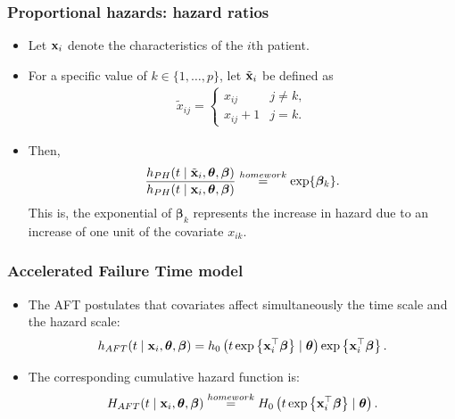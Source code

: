 \documentclass[10pt,handout,compress]{beamer}
\newcommand{\bbeta}{\bm{\beta}}
\newcommand{\btheta}{\bm{\theta}}
\newcommand{\bx}{{\bf x}}
\begin{document}
\begin{frame}
\frametitle{Proportional hazards: hazard ratios}
\begin{itemize}
\item Let $\bx_i$ denote the characteristics of the $i$th patient. \pause
\item For a specific value of $k\in\{1,\dots,p\}$, let $\tilde{\bx}_i$ be defined as 
\begin{eqnarray*}
\tilde{x}_{ij} =
\begin{cases}
x_{ij} & j\neq k,\\
x_{ij}+1 & j = k.
\end{cases}
\end{eqnarray*}
\pause
\item Then,
\[ \dfrac{h_{PH}(t \mid \tilde{\bx}_i, \btheta,\bbeta)}{h_{PH}(t \mid \bx_i, \btheta,\bbeta)}  \stackrel{\tiny homework}{=} \exp\{\bbeta_k\} .\]
\pause This is, the exponential of $\bbeta_k$ represents the increase in hazard due to an increase of one unit of the covariate  $x_{ik}$.
\end{itemize}
\end{frame}

\begin{frame}
\frametitle{Accelerated Failure Time model}
\begin{itemize}
\item The AFT postulates that covariates affect simultaneously the time scale and the hazard scale:
\begin{equation*}
h_{AFT}(t \mid \bx_i, \btheta,\bbeta) = h_0\left(t  \exp\left\{ \bx_i ^{\top}\bbeta\right\}\mid \btheta\right) \exp\left\{ \bx_i ^{\top}\bbeta\right\} .
\end{equation*}
\pause
\item The corresponding cumulative hazard function is:
\begin{equation*}
H_{AFT}(t \mid \bx_i, \btheta,\bbeta) \stackrel{\tiny homework}{=}  H_0\left(t  \exp\left\{ \bx_i ^{\top}\bbeta\right\}\mid \btheta\right)  .
\end{equation*}
\end{itemize}
\end{frame}
\end{document}
